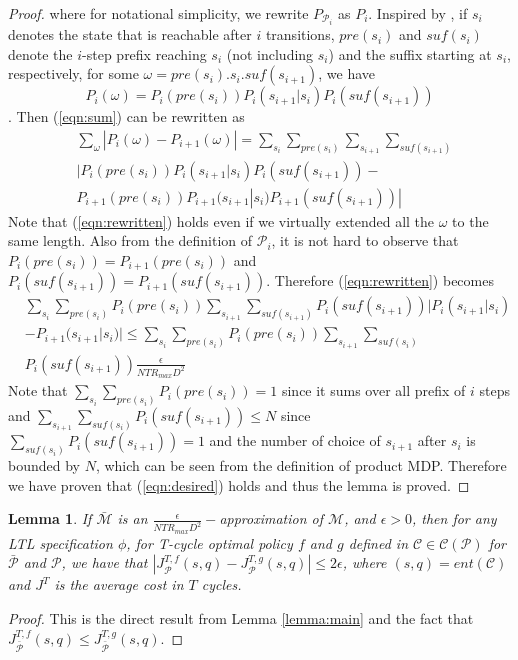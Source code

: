 \documentclass[journal]{IEEEtran}
\newtheorem{lemma}{Lemma}
\begin{document}
\begin{proof}
	where for notational simplicity, we rewrite $P_{\mathcal{P}_{i}}$ as $P_i$. Inspired by \cite{brafman2002r},  if $s_i$ denotes the state that is reachable after $i$ transitions, $pre(s_i)$ and $suf(s_i)$ denote the $i$-step prefix reaching $s_i$ (not including $s_i$) and the suffix starting at $s_i$, respectively, for some $\omega = pre(s_i).s_i.suf(s_{i+1})$, we have 
	$$
	P_i(\omega) = P_i(pre(s_i))P_i(s_{i+1}|s_i)P_i(suf(s_{i+1}))
	$$. Then (\ref{eqn:sum}) can be rewritten as 
	\begin{equation} \label{eqn:rewritten}
		\begin{split}
			&\sum_{\omega}|P_{{i}} (\omega) -P_{{i+1}}(\omega)| = \sum_{s_i}\sum_{pre(s_i)}\sum_{s_{i+1}}\sum_{suf(s_{i+1})}\\
			& |P_i(pre(s_i))P_i(s_{i+1}|s_i)P_i(suf(s_{i+1}))-\\
			& P_{i+1}(pre(s_{i}))P_{i+1}(s_{i+1}|s_i)P_{i+1}(suf(s_{i+1}))|
		\end{split}
	\end{equation}
	Note that (\ref{eqn:rewritten}) holds even if we virtually extended all the $\omega$ to the same length. Also from the definition of $\mathcal{P}_i$, it is not hard to observe that $P_i(pre(s_i)) = P_{i+1}(pre(s_i))$ and $P_i(suf(s_{i+1}))=P_{i+1}(suf(s_{i+1}))$. Therefore (\ref{eqn:rewritten}) becomes
	\begin{equation} 
		\begin{split}
			& \sum_{s_i}\sum_{pre(s_i)}P_i(pre(s_i))\sum_{s_{i+1}}\sum_{suf(s_{i+1})} P_i(suf(s_{i+1})) |P_i(s_{i+1}|s_i)\\
			& -P_{i+1}(s_{i+1}|s_i)|\leq \sum_{s_i}\sum_{pre(s_i)}P_i(pre(s_i))\sum_{s_{i+1}}\sum_{suf(s_i)}\\ &P_i(suf(s_{i+1}))\frac{\epsilon}{NTR_{max}D^2}
		\end{split}
	\end{equation}
	Note that $\sum_{s_i}\sum_{pre(s_i)}P_i(pre(s_i))=1$ since it sums over all prefix of $i$ steps and $\sum_{s_{i+1}}\sum_{suf(s_i)}P_i(suf(s_{i+1}))\leq N$ since $\sum_{suf(s_i)}P_i(suf(s_{i+1}))=1$ and the number of choice of $s_{i+1}$ after $s_i$ is bounded by $N$, which can be seen from the definition of product MDP. Therefore we have proven that (\ref{eqn:desired}) holds and thus the lemma is proved.
\end{proof}

\begin{lemma}\label{lemma:optimal}
	If $\bar{\mathcal{M}}$ is an $\frac{\epsilon}{NTR_{max}D^2}-$approximation of $\mathcal{M}$, and $\epsilon>0$, then for any LTL specification $\phi$, for T-cycle optimal policy $f$ and $g$ defined in $\mathcal{C}\in\mathcal{C}(
	\mathcal{P})$ for $\bar{\mathcal{P}}$ and $\mathcal{P}$, we have that $|J^{T,f}_{\mathcal{P}}(s,q)-J^{T,g}_{\mathcal{P}}(s,q)|\leq2\epsilon$, where $(s,q)=ent(\mathcal{C})$ and $J^T$ is the average cost in $T$ cycles.    
\end{lemma} 
\begin{proof}
	This is the direct result from Lemma \ref{lemma:main} and the fact that $J^{T,f}_{\bar{\mathcal{P}}}(s,q)\leq J^{T,g}_{\bar{\mathcal{P}}}(s,q)$.
\end{proof}
\end{document}
